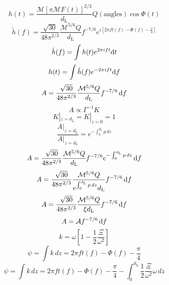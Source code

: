 \cite{Poisson1995}
\begin{equation}
    h(t)=\frac{\mathcal{M}[\pi \mathcal{M}F(t)]^{2/3}}{d_\text{L}}Q(\text{angles})\cos\Phi(t)
\end{equation}
\begin{equation}
    \tilde{h}(f)=\frac{\sqrt{30}}{48\pi^{2/3}}\frac{\mathcal{M}^{5/6}Q}{d_\text{L}}f^{-7/6}e^{i[2\pi ft(f)-\Phi(f)-\frac{\pi}{4}]}
\end{equation}
\begin{equation}
    \tilde{h}(f)=\int h(t)e^{2\pi i f t}\mathrm{d} t
\end{equation}
\begin{equation}
    h(t)=\int \tilde{h}(f)e^{-2\pi i f t}\mathrm{d} f
\end{equation}
\begin{equation}
    A=\frac{\sqrt{30}}{48\pi^{2/3}}\frac{\mathcal{M}^{5/6}Q}{d_\text{L}}f^{-7/6}\,\mathrm{d} f
\end{equation}
\begin{equation}
    A\propto\Gamma^{-1}K
\end{equation}
\begin{equation}
    K|_{z=d_\text{L}}=K|_{z=0}=1
\end{equation}
\begin{equation}
    \frac{A|_{z=d_\text{L}}}{A|_{z=d_0}}=e^{-\int_0^{d_\text{L}}p\,d z}
\end{equation}
\begin{equation}
    A=\frac{\sqrt{30}}{48\pi^{2/3}}\frac{\mathcal{M}^{5/6}Q}{d_\text{L}}f^{-7/6}e^{-\int_0^{d_\text{L}}p\,d z}\,\mathrm{d} f
\end{equation}
\begin{equation}
    A=\frac{\sqrt{30}}{48\pi^{2/3}}\frac{\mathcal{M}^{5/6}Q}{e^{\int_0^{d_\text{L}}p\,d z}d_\text{L}}f^{-7/6}\,\mathrm{d} f
\end{equation}
\begin{equation}
    A=\frac{\sqrt{30}}{48\pi^{2/3}}\frac{\mathcal{M}^{5/6}Q}{\xi d_\text{L}}f^{-7/6}\,\mathrm{d} f
\end{equation}
\begin{equation}
    A=\mathcal{A}f^{-7/6}\,\mathrm{d} f
\end{equation}
\begin{equation}
    k=\omega[1-\frac{1}{2}\frac{\Xi}{\omega^2}]
\end{equation}
\begin{equation}
    \psi=\int k\,d z=2\pi ft(f)-\Phi(f)-\frac{\pi}{4}
\end{equation}
\begin{equation}
    \psi=\int k\,d z=2\pi ft(f)-\Phi(f)-\frac{\pi}{4}-\int_0^{d_\text{L}} \frac{1}{2}\frac{\Xi}{\omega^2}\omega\,d z
\end{equation}
